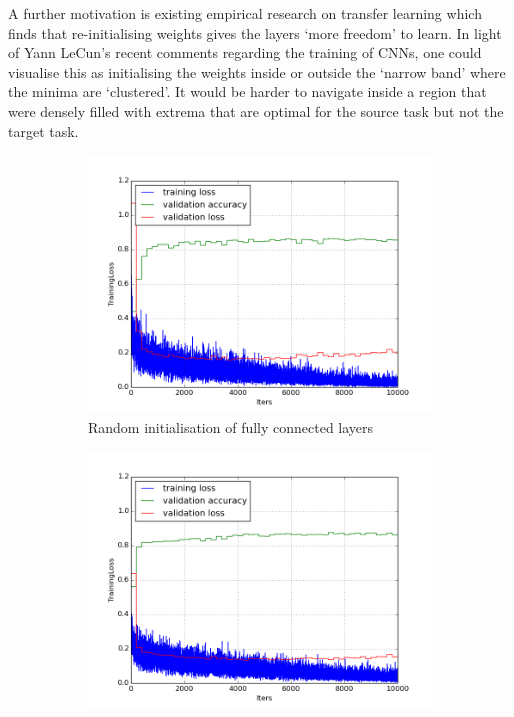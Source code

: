 \documentclass[a4paper,11pt]{article}
\begin{document}
A further motivation is existing empirical research \cite{transfer-learning} \cite{decaf} on transfer learning which finds that re-initialising weights gives the layers `more freedom' to learn. In light of Yann LeCun's recent comments regarding the training of CNNs\cite{labex-bezout}, one could visualise this as initialising the weights inside or outside the `narrow band' where the minima are `clustered'. It would be harder to navigate inside a region that were densely filled with extrema that are optimal for the source task but not the target task.  \\

\begin{figure}
    \centering
    \begin{minipage}[b]{\textwidth}
      \begin{subfigure}{.5\textwidth} 
        \centering
        \includegraphics[scale=0.4]{images/plot_clampdet_none_reinit.png}
        \caption{Random initialisation of fully connected layers}\label{fig:2a}
      \end{subfigure}%
      \begin{subfigure}{.5\textwidth} 
        \centering
        \includegraphics[scale=0.4]{images/plot_clampdet_none-10k.png}

\end{subfigure}
\end{minipage}
\end{figure}
\end{document}
